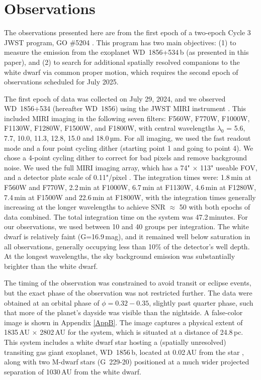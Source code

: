 \documentclass[twocolumn]{aastex631}
\begin{document}
\section{Observations} \label{sec:obs}

The observations presented here are from the first epoch of a two-epoch Cycle 3 JWST program, GO \#5204 \citep{2024jwst.prop.5204L}. This program has two main objectives: (1) to measure the emission from the exoplanet WD~1856+534\,b (as presented in this paper), and (2) to search for additional spatially resolved companions to the white dwarf via common proper motion, which requires the second epoch of observations scheduled for July 2025. 

The first epoch of data was collected on July 29, 2024, and we observed WD~1856+534 (hereafter WD~1856) using the JWST MIRI instrument \citep{2024jwst.prop.5204L}. This included MIRI imaging in the following seven filters: F560W, F770W, F1000W, F1130W, F1280W, F1500W, and F1800W, with central wavelengths $\lambda_0$ = 5.6, 7.7, 10.0, 11.3, 12.8, 15.0 and 18.0\,µm. For all imaging, we used the fast readout mode and a four point cycling dither (starting point 1 { and going to point 4}). We chose a 4-point cycling dither to correct for bad pixels and remove background noise. We used the full MIRI imaging array, which has a 74" $\times$ 113" useable FOV, and a detector plate scale of 0.11"/pixel \citep{2015PASP..127..612B}.  The integration { times were: 1.8\,min at F560W and F770W, 2.2\,min at F1000W, 6.7\,min at F1130W, 4.6\,min at F1280W, 7.4\,min at F1500W and 22.6\,min at F1800W}, with the integration times generally increasing at the longer wavelengths to achieve SNR $\approx$ 50 with both epochs of data combined. The total integration time on the system was 47.2\,minutes. For our observations, we used between 10 and 40 groups per integration. The white dwarf is relatively faint (G=16.9\,mag), and it remained well below saturation in all observations, generally occupying less than 10\% of the detector's well depth. At the longest wavelengths, the sky background emission was substantially brighter than the white dwarf.

The timing of the observation was constrained to avoid transit or eclipse events, but the exact phase of the observation was not restricted further. The data were obtained at an orbital phase of $\phi = 0.32-0.35$, slightly past quarter phase, such that more of the planet's dayside was visible than the nightside. A false-color image is shown in { Appendix \ref{AppB}}. The image captures a physical extent of 1835\,AU $\times$ 2802\,AU for the system, which is situated at a distance of 24.8\,pc.
This system includes a white dwarf star hosting a (spatially unresolved) transiting gas giant exoplanet, WD~1856\,b, located at 0.02\,AU from the star \citep{Vanderburg_2020}, along with two M-dwarf stars (G~229-20) positioned at a much wider projected separation of 1030\,AU from the white dwarf. 
\end{document}

